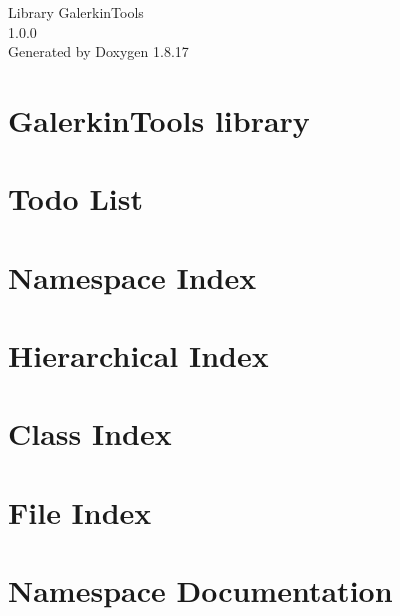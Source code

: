 \let\mypdfximage\pdfximage\def\pdfximage{\immediate\mypdfximage}\documentclass[twoside]{book}
\newcommand{\+}{\discretionary{\mbox{\scriptsize$\hookleftarrow$}}{}{}}
\newcommand{\clearemptydoublepage}{%
  \newpage{\pagestyle{empty}\cleardoublepage}%
}
\begin{document}
\hypersetup{pageanchor=false,
             bookmarksnumbered=true,
             pdfencoding=unicode
            }
\begin{titlepage}
\vspace*{7cm}
\begin{center}%
{\Large Library Galerkin\+Tools \\[1ex]\large 1.\+0.\+0 }\\
\vspace*{1cm}
{\large Generated by Doxygen 1.8.17}\\
\end{center}
\end{titlepage}
\clearemptydoublepage
{}
\tableofcontents
\clearemptydoublepage
{}
\hypersetup{pageanchor=true}

\chapter{Galerkin\+Tools library}
\label{index}\hypertarget{index}{}
\chapter{Todo List}
\label{todo}

\chapter{Namespace Index}

\chapter{Hierarchical Index}

\chapter{Class Index}

\chapter{File Index}

\chapter{Namespace Documentation}


\end{document}
